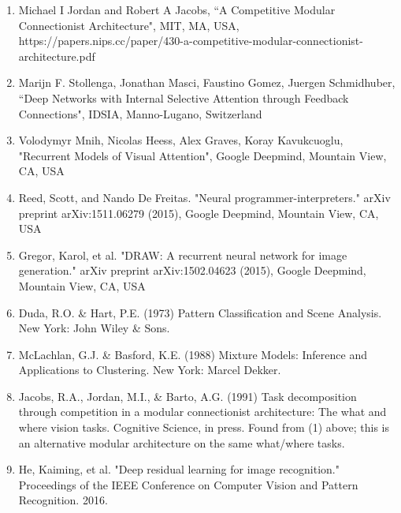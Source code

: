 \documentclass[12pt]{article}
\begin{document}


\begin{enumerate}
\item 	Michael I Jordan and Robert A Jacobs, ``A Competitive Modular Connectionist Architecture", MIT, MA, USA, https://papers.nips.cc/paper/430-a-competitive-modular-connectionist-architecture.pdf
\item 	Marijn F. Stollenga, Jonathan Masci, Faustino Gomez, Juergen Schmidhuber, ``Deep Networks with Internal Selective Attention through Feedback Connections", IDSIA, Manno-Lugano, Switzerland
\item 	Volodymyr Mnih, Nicolas Heess, Alex Graves, Koray Kavukcuoglu, "Recurrent Models of Visual Attention", Google Deepmind, Mountain View, CA, USA
\item	Reed, Scott, and Nando De Freitas. "Neural programmer-interpreters." arXiv preprint arXiv:1511.06279 (2015), Google Deepmind, Mountain View, CA, USA
\item	Gregor, Karol, et al. "DRAW: A recurrent neural network for image generation." arXiv preprint arXiv:1502.04623 (2015), Google Deepmind, Mountain View, CA, USA
	\item Duda, R.O. \& Hart, P.E. (1973) Pattern Classification and Scene Analysis. New York: John Wiley \& Sons. 
	\item McLachlan, G.J. \& Basford, K.E. (1988) Mixture Models: Inference and Applications to Clustering. New York: Marcel Dekker.
	\item Jacobs, R.A., Jordan, M.I., \& Barto, A.G. (1991) Task decomposition through competition in a modular connectionist architecture: The what and where vision tasks. Cognitive Science, in press.  Found from (1) above; this is an alternative modular architecture on the same what/where tasks.
	\item He, Kaiming, et al. "Deep residual learning for image recognition." Proceedings of the IEEE Conference on Computer Vision and Pattern Recognition. 2016.
\end{enumerate}
\end{document}
